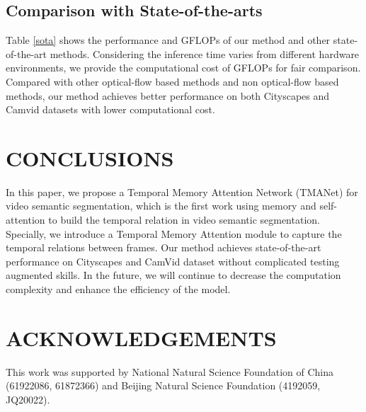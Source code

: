\documentclass{article}
\begin{document}
	
	


	\subsection{Comparison with State-of-the-arts}
	\label{ssec:sota}
Table \ref{sota} shows the performance and GFLOPs of our method and other state-of-the-art methods. Considering the inference time varies from different hardware environments, we provide the computational cost of GFLOPs for fair comparison. Compared with other optical-flow based methods and non optical-flow based methods, our method  achieves better performance on both Cityscapes and Camvid datasets with lower computational cost.
	
	
	\section{CONCLUSIONS}
	\label{sec:conclusions}
	
In this paper, we propose a Temporal Memory Attention Network (TMANet) for video semantic segmentation, which is the first work using memory and self-attention to build the temporal relation in video semantic segmentation. 
	Specially, we introduce a Temporal Memory Attention module to capture the temporal relations between frames. 
	Our method achieves state-of-the-art performance on Cityscapes and CamVid dataset without complicated testing augmented skills. 
	In the future, we will continue to decrease the computation complexity and enhance the efficiency of the model.
	
	\section{ACKNOWLEDGEMENTS}
	\label{sec:conclusions}
	This work was supported by National Natural Science Foundation of China (61922086, 61872366) and Beijing Natural Science Foundation (4192059, JQ20022).

	
	
\end{document}
